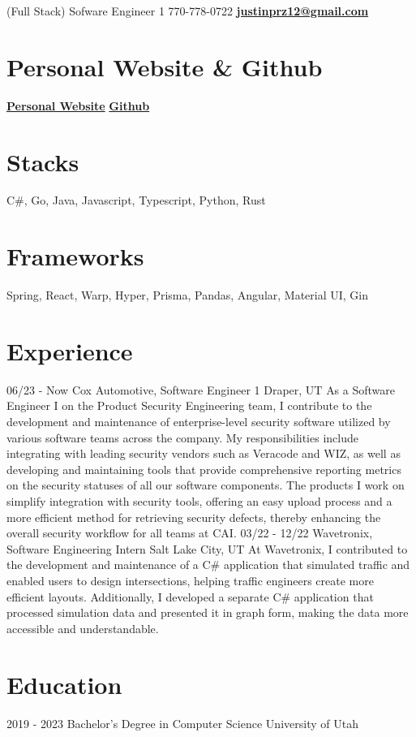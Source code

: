 \documentclass[]{friggeri-cv}
\begin{document}
      {(Full Stack) Sofware Engineer 1}
      {770-778-0722   \href{mailto:justinprz12@gmail.com}{\textbf{justinprz12@gmail.com}}}
      

\begin{aside}
  \section{Personal Website \& Github}
    \href{http://www.justindavidperez.com}{\textbf{Personal Website}}
    \href{https://github.com/JustinPerez12}{\textbf{Github}}
  \section{Stacks}
    C\#, Go, Java, Javascript, Typescript, Python, Rust
    \section{Frameworks}
    Spring, React, Warp, Hyper, Prisma, Pandas, Angular, Material UI, Gin
\end{aside}

\section{Experience}
\begin{entrylist}
	\entry
	{06/23 - Now}
	{Cox Automotive, Software Engineer 1}
	{Draper, UT}
	{As a Software Engineer I on the Product Security Engineering team, I contribute to the development and maintenance of enterprise-level security software utilized by various software teams across the company. My responsibilities include integrating with leading security vendors such as Veracode and WIZ, as well as developing and maintaining tools that provide comprehensive reporting metrics on the security statuses of all our software components. The products I work on simplify integration with security tools, offering an easy upload process and a more efficient method for retrieving security defects, thereby enhancing the overall security workflow for all teams at CAI.}
  \entry
  {03/22 - 12/22}
  {Wavetronix, Software Engineering Intern}
  {Salt Lake City, UT}
  {At Wavetronix, I contributed to the development and maintenance of a C\# application that simulated traffic and enabled users to design intersections, helping traffic engineers create more efficient layouts. Additionally, I developed a separate C\# application that processed simulation data and presented it in graph form, making the data more accessible and understandable.} 
\end{entrylist}

\section{Education}
\begin{entrylist}
  \entry
    {2019 - 2023}
    {Bachelor's Degree in Computer Science}
    {University of Utah}
    {}
\end{entrylist}
\end{document}
